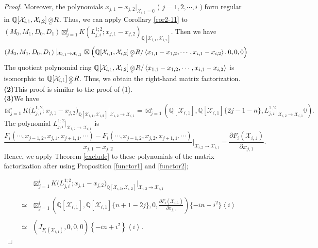 \documentclass[10pt]{amsart}
\theoremstyle{break}
\begin{document}
\begin{proof}
Moreover, the polynomials  $x_{j,1}-x_{j,2}|_{\mathcal{X}_{i,1}=0}$ ( $j=1,2,\cdots ,i$ ) form regular in ${{\mathbb{Q}}} [\mathcal{X}_{i,1},\mathcal{X}_{i,2}] {{\,\otimes\hspace{-0.7em}\raisebox{-0.5ex}{${}_{{}_{S}}$}\,}} R$.
Thus, we can apply Corollary \ref{cor2-11} to $\left( M_0,M_1,D_0,D_1 \right)
\mathop{\boxtimes}_{j=1}^{i} K\left( L_{j,i}^{1;2};x_{j,1}-x_{j,2} \right)_{{{\mathbb{Q}}} [\mathcal{X}_{i,1} ,\mathcal{X}_{i,2} ]}$. 
Then we have 
$$
\left( M_0 ,M_1,D_0,D_1\right)\left|_{\mathcal{X}_{i,1}\to\mathcal{X}_{i,2}}\right.
\boxtimes \left({{\mathbb{Q}}} [\mathcal{X}_{i,1},\mathcal{X}_{i,2}] {{\,\otimes\hspace{-0.7em}\raisebox{-0.5ex}{${}_{{}_{S}}$}\,}} R/ \left<x_{1,1}-x_{1,2}, \cdots ,x_{i,1}-x_{i,2} \right>,0,0,0\right)
$$
The quotient polynomial ring 
${{\mathbb{Q}}} [\mathcal{X}_{i,1},\mathcal{X}_{i,2}] {{\,\otimes\hspace{-0.7em}\raisebox{-0.5ex}{${}_{{}_{S}}$}\,}} R/ \left<x_{1,1}-x_{1,2}, \cdots ,x_{i,1}-x_{i,2} \right>$ is isomorphic to
${{\mathbb{Q}}} [\mathcal{X}_{i,1}] {{\,\otimes\hspace{-0.7em}\raisebox{-0.5ex}{${}_{{}_{S}}$}\,}} R$.
Thus, we obtain the right-hand matrix factorization.\\

{\bf (2)}This proof is similar to the proof of (1).\\

{\bf (3)}We have
\begin{equation*}
\mathop{\boxtimes}_{j=1}^{i} 
K\Big( L^{1;2}_{j,i} ;x_{j,1}-x_{j,2} \Big)_{{{\mathbb{Q}}} [\mathcal{X}_{i,1} ,\mathcal{X}_{i,2} ]}\Big|_{\mathcal{X}_{i,2} \to \mathcal{X}_{i,1}} =
\mathop{\boxtimes}_{j=1}^{i} 
\left(
	{{\mathbb{Q}}} [\mathcal{X}_{i,1}],{{\mathbb{Q}}} [\mathcal{X}_{i,1}]\{ 2j-1-n \},L^{1;2}_{j,i}|_{\mathcal{X}_{i,2} \to \mathcal{X}_{i,1}}0 \right).
\end{equation*}
The polynomial $L^{1;2}_{j,i}|_{\mathcal{X}_{i,2} \to \mathcal{X}_{i,1}}$ is
$$
\frac{F_{i}(\cdots ,x_{j-1,2},x_{j,1},x_{j+1,1},\cdots )-F_{i}(\cdots ,x_{j-1,2},x_{j,2},x_{j+1,1},\cdots )}{x_{j,1}-x_{j,2}}
\Big|_{\mathcal{X}_{i,2} \to \mathcal{X}_{i,1}} =\frac{\partial F_{i}(\mathcal{X}_{i,1})}{\partial x_{j,1}}.
$$
Hence, we apply Theorem \ref{exclude} to these polynomials of the matrix factorization after using Proposition \ref{functor1} and \ref{functor2};

\begin{eqnarray*}
&&\mathop{\boxtimes}_{j=1}^{i} 
K\Big( L^{1;2}_{j,i} ;x_{j,1}-x_{j,2} \Big)_{{{\mathbb{Q}}} [\mathcal{X}_{i,1} ,\mathcal{X}_{i,2} ]}\Big|_{\mathcal{X}_{i,2}\to\mathcal{X}_{i,1}}\\
&&\\[-0.1em]
&\simeq&
\mathop{\boxtimes}_{j=1}^{i} 
\left( {{\mathbb{Q}}} [\mathcal{X}_{i,1}],{{\mathbb{Q}}} [\mathcal{X}_{i,1}]\{ n+1-2j \},0,\frac{\partial F_{i}(\mathcal{X}_{i,1})}{\partial x_{j,1}}\right) \{ -i n + i^2 \} \left< i \right> \\[-0.1em]
&&\\[-0.1em]
&\simeq&\left(J_{F_{i}(\mathcal{X}_{i,1})},0,0,0\right)
\left\{ -in+i^2 \right\} \left< i \right>.
\end{eqnarray*}


\end{proof}
\end{document}
